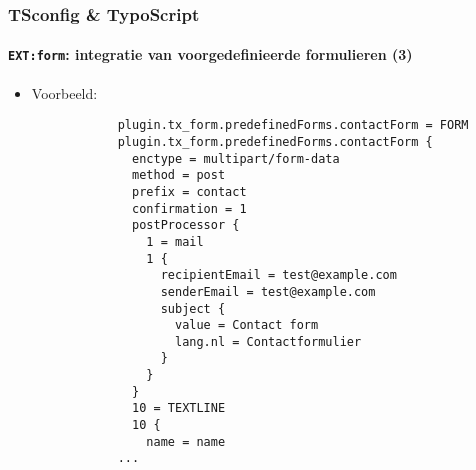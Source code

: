 \begin{frame}[fragile]
	\frametitle{TSconfig \& TypoScript}
	\framesubtitle{\texttt{EXT:form}: integratie van voorgedefinieerde formulieren (3)}

	\lstset{basicstyle=\tiny\ttfamily}

	\begin{itemize}

		\item Voorbeeld:

		\begin{lstlisting}
			plugin.tx_form.predefinedForms.contactForm = FORM
			plugin.tx_form.predefinedForms.contactForm {
			  enctype = multipart/form-data
			  method = post
			  prefix = contact
			  confirmation = 1
			  postProcessor {
			    1 = mail
			    1 {
			      recipientEmail = test@example.com
			      senderEmail = test@example.com
			      subject {
			        value = Contact form
			        lang.nl = Contactformulier
			      }
			    }
			  }
			  10 = TEXTLINE
			  10 {
			    name = name
			...
		\end{lstlisting}

	\end{itemize}

\end{frame}

